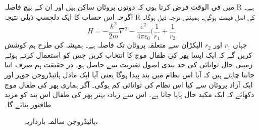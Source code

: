 میں فی الوقت فرض کرتا ہوں کہ دونوں پروٹان ساکن ہیں اور ان کے بیچ فاصلہ R  ہے۔ اگرچہ اس حساب کا ایک دلچسپ ذیلی نتیجہ R کی اصل قیمت ہوگی۔  ہمیٹنی درجہ ذیل ہوگا۔
 \[H=-\frac{\hbar^{2}}{2m}\nabla^{2}-\frac{e^{2}}{4\pi\epsilon_{0}}(\frac{1}{r_{1}}+\frac{1}{r_{2}}\]
جہاں
\( r_{1}\)  
اور 
\(r_{2}\) 
الیکڑان سے متعلقہ پروٹان تک فاصلہ ہے۔ ہمیشہ کی طرح ہم کوشش کریں گے کہ ایک ایسا پھر کی طفال موج کا انتخاب کریں جس کو استعمال کرتے ہوئے زمینی حال توانائی کی حد بندی اصول تغیریت سے حاصل ہو۔ در حقیقت ہم صرف اتنا جاننا چاہتے ہیں کہ آیا اس نظام میں  بند پیدا ہوگا یعنی آیا ایک مادل ہائیڈروجن جوہر اور ایک آزاد پروٹان سے کیا اس نظام کی توانائی کم ہوگی۔ آگر ہماری پھر کی طفال موج دکھائے کہ ایک مکید حال پایا جاتا ہے۔ اس سے زیادہ بہتر پھر کی طفال اس بند کو مزید طاقتور بنائے گا۔
\begin{figure}
\centering
{}
\caption{ہائیڈروجن سالمہ بارداریہ، }
\label{شکل_تغیریت_ہائیڈروجن_سالمہ_بارداریہ}
\end{figure}


